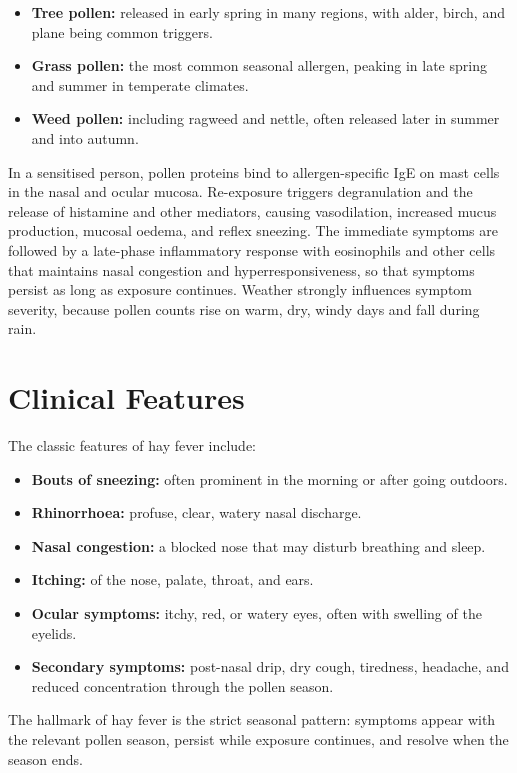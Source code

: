 \begin{itemize}
    \item \textbf{Tree pollen:} released in early spring in many regions, with alder, birch, and plane being common triggers.
    \item \textbf{Grass pollen:} the most common seasonal allergen, peaking in late spring and summer in temperate climates.
    \item \textbf{Weed pollen:} including ragweed and nettle, often released later in summer and into autumn.
\end{itemize}

In a sensitised person, pollen proteins bind to allergen-specific IgE on mast cells in the nasal and ocular mucosa. Re-exposure triggers degranulation and the release of histamine and other mediators, causing vasodilation, increased mucus production, mucosal oedema, and reflex sneezing. The immediate symptoms are followed by a late-phase inflammatory response with eosinophils and other cells that maintains nasal congestion and hyperresponsiveness, so that symptoms persist as long as exposure continues. Weather strongly influences symptom severity, because pollen counts rise on warm, dry, windy days and fall during rain.

\section*{Clinical Features}
The classic features of hay fever include:

\begin{itemize}
    \item \textbf{Bouts of sneezing:} often prominent in the morning or after going outdoors.
    \item \textbf{Rhinorrhoea:} profuse, clear, watery nasal discharge.
    \item \textbf{Nasal congestion:} a blocked nose that may disturb breathing and sleep.
    \item \textbf{Itching:} of the nose, palate, throat, and ears.
    \item \textbf{Ocular symptoms:} itchy, red, or watery eyes, often with swelling of the eyelids.
    \item \textbf{Secondary symptoms:} post-nasal drip, dry cough, tiredness, headache, and reduced concentration through the pollen season.
\end{itemize}

The hallmark of hay fever is the strict seasonal pattern: symptoms appear with the relevant pollen season, persist while exposure continues, and resolve when the season ends.

